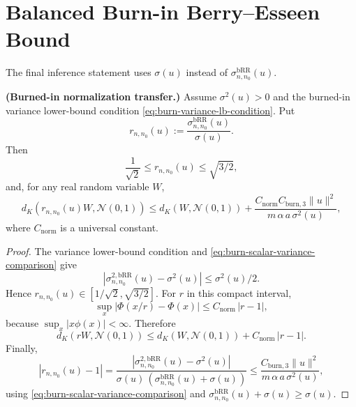 
\section{Balanced Burn-in Berry--Esseen Bound}

The final inference statement uses $\sigma(u)$ instead of
$\sigma_{n,n_{0}}^{\mathrm{bRR}}(u)$.

\begin{lemma}\label{lem:burn-normalization-transfer}
  \textbf{(Burned-in normalization transfer.)}
  Assume $\sigma^{2}(u) > 0$ and the burned-in variance lower-bound condition
  \eqref{eq:burn-variance-lb-condition}. Put
  \[
r_{n,n_{0}}(u)
    := \frac{\sigma_{n,n_{0}}^{\mathrm{bRR}}(u)}{\sigma(u)}.
\]
  Then
  \[
\frac{1}{\sqrt{2}} \le r_{n,n_{0}}(u) \le \sqrt{3 / 2},
\]
  and, for any real random variable $W$,
  \begin{equation}
d_{K} \left( r_{n,n_{0}}(u) W, \mathcal{N}(0, 1) \right)
    \le d_{K} \left( W, \mathcal{N}(0, 1) \right)
     + \frac{C_{\mathrm{norm}} C_{\mathrm{burn,3}} \lVert u \rVert^{2}}{m \, \alpha \, a \, \sigma^{2}(u)},
\label{eq:burn-normalization-transfer}
\end{equation}
  where $C_{\mathrm{norm}}$ is a universal constant.
\end{lemma}

\begin{proof} The variance lower-bound condition and
\eqref{eq:burn-scalar-variance-comparison} give
\[
|\sigma_{n,n_{0}}^{2, \mathrm{bRR}}(u) - \sigma^{2}(u)| \le \sigma^{2}(u) / 2.
\]
Hence $r_{n,n_{0}}(u) \in [1 / \sqrt{2}, \sqrt{3 / 2}]$. For $r$ in this
compact interval,
\[
\sup_{x} | \Phi(x / r) - \Phi(x) | \le C_{\mathrm{norm}} \, |r - 1|,
\]
because $\sup_{x} |x \phi(x)| < \infty$. Therefore
\[
d_{K} (r W, \mathcal{N}(0, 1))
  \le d_{K} (W, \mathcal{N}(0, 1)) + C_{\mathrm{norm}} \, |r - 1|.
\]
Finally,
\[
|r_{n,n_{0}}(u) - 1|
  = \frac{|\sigma_{n,n_{0}}^{2, \mathrm{bRR}}(u) - \sigma^{2}(u)|}{\sigma(u) \, (\sigma_{n,n_{0}}^{\mathrm{bRR}}(u) + \sigma(u))}
  \le \frac{C_{\mathrm{burn,3}} \lVert u \rVert^{2}}{m \, \alpha \, a \, \sigma^{2}(u)},
\]
using \eqref{eq:burn-scalar-variance-comparison} and
$\sigma_{n,n_{0}}^{\mathrm{bRR}}(u) + \sigma(u) \ge \sigma(u)$. \end{proof}

